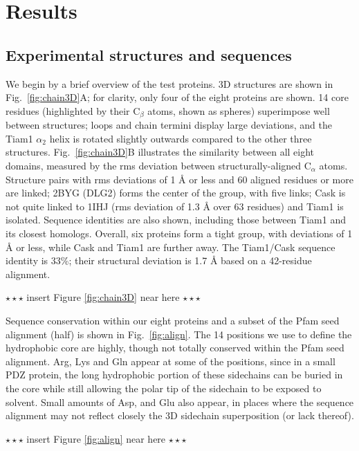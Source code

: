\documentclass[12pt]{article}
\begin{document}
\section{Results}
\subsection{Experimental structures and sequences}
We begin by a brief overview of the test proteins. 3D structures are shown in Fig.\ \ref{fig:chain3D}A; for clarity, only
four of the eight proteins are shown. 14 core residues (highlighted by their C$_{\beta}$ atoms, shown as spheres) superimpose
well between structures; loops and chain termini display large deviations, and the Tiam1 $\alpha_2$ helix is rotated slightly
outwards compared to the other three structures. Fig.\ \ref{fig:chain3D}B illustrates the similarity between all eight domains,
measured by the rms deviation between structurally-aligned C$_{\alpha}$ atoms. Structure pairs with rms deviations of 1 {\AA}
or less and 60 aligned residues or more are linked; 2BYG (DLG2) forms the center of the group, with five links; Cask is not
quite linked to 1IHJ (rms deviation of 1.3 {\AA} over 63 residues) and Tiam1 is isolated. Sequence identities are also shown,
including those between Tiam1 and its closest homologs. Overall, six proteins form a tight group, with deviations of 1 {\AA}
or less, while Cask and Tiam1 are further away. The Tiam1/Cask sequence identity is 33\%; their structural deviation is 1.7
{\AA} based on a 42-residue alignment. 
\begin{center} $\star \star \star$ insert Figure \ref{fig:chain3D} near here $\star \star \star$ \end{center}


Sequence conservation within our eight proteins and a subset of the Pfam seed alignment (half) is shown in Fig.\ \ref{fig:align}.
The 14 positions we use to define the hydrophobic core are highly, though not totally conserved within the Pfam seed alignment.
Arg, Lys and Gln appear at some of the positions, since in a small PDZ protein, the long hydrophobic portion of these sidechains
can be buried in the core while still allowing the polar tip of the sidechain to be exposed to solvent. Small amounts of Asp, and
Glu also appear, in places where the sequence alignment may not reflect closely the 3D sidechain superposition (or lack thereof).
\begin{center} $\star \star \star$ insert Figure \ref{fig:align} near here $\star \star \star$ \end{center}
\end{document}
